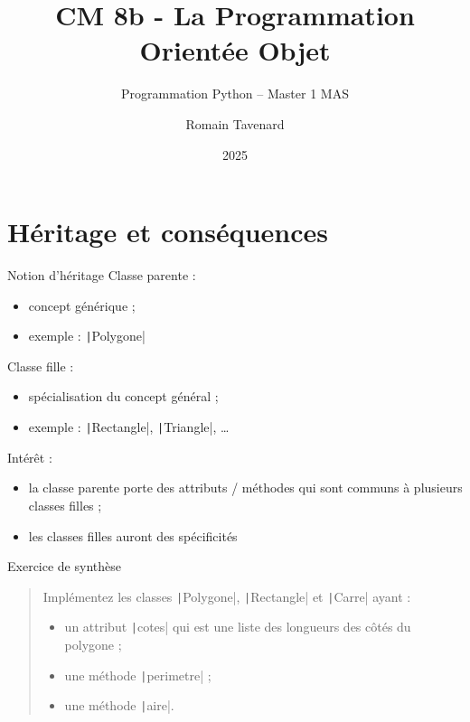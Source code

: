 \documentclass[10pt]{beamer}
\title[M1 MAS -- Python -- POO]{CM 8b - La Programmation Orientée Objet}
\subtitle{Programmation Python -- Master 1 MAS}
\author{Romain Tavenard}
\date{2025}
\institute{%
\hypersetup{urlcolor=.}
\makebox[2.2ex][c]{\faEnvelope}\enspace\href{mailto:romain.tavenard@univ-rennes2.fr}{\texttt{romain.tavenard@univ-rennes2.fr}}\\%
}
\begin{document}
\maketitle

\section{Héritage et conséquences}

\begin{frame}[fragile]{Notion d'héritage}
  Classe parente :

  \begin{itemize}
    \item concept générique ;
    \item exemple : \texttt|Polygone|
  \end{itemize}

  Classe fille :

  \begin{itemize}
    \item spécialisation du concept général ;
    \item exemple : \texttt|Rectangle|, \texttt|Triangle|, \dots
  \end{itemize}

  Intérêt :

  \begin{itemize}
    \item la classe parente porte des attributs / méthodes qui sont communs à plusieurs classes filles ;
    \item les classes filles auront des spécificités
  \end{itemize}
\end{frame}

\begin{frame}[fragile]{Exercice de synthèse}
  \begin{quote}
    Implémentez les classes \texttt|Polygone|, \texttt|Rectangle| et \texttt|Carre| ayant :
    \begin{itemize}
      \item un attribut \texttt|cotes| qui est une liste des longueurs des côtés du polygone ;
      \item une méthode \texttt|perimetre| ;
      \item une méthode \texttt|aire|.
    \end{itemize}
  \end{quote}
\end{frame}
\end{document}
